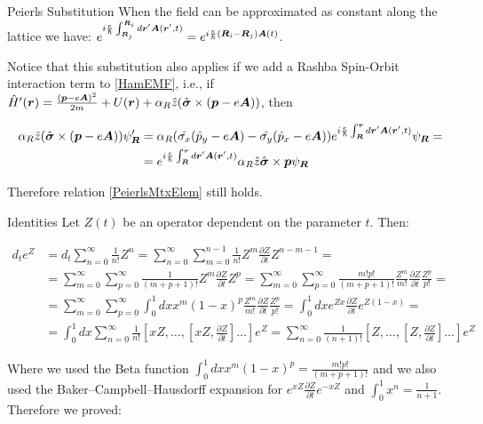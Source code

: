 \begin{subappendices}
\begin{section}{Peierls Substitution}
When the field can be approximated as constant along the lattice we have: $e^{i\frac{e}{\hbar}\int_{\boldsymbol{R}_j}^{\boldsymbol{R}_i} d\boldsymbol{r}'\boldsymbol{A}(\boldsymbol{r}',t)} = e^{i\frac{e}{\hbar} (\boldsymbol{R}_i-\boldsymbol{R}_j) \boldsymbol{A}(t)}$.

Notice that this substitution also applies if we add a Rashba Spin-Orbit interaction term to \ref{HamEMF}, i.e., if $\hat{H}'(\boldsymbol{r}) = \frac{(\boldsymbol{p}-e\boldsymbol{A})^2}{2m} +U(\boldsymbol{r}) + \alpha_R \hat{z}(\hat{\boldsymbol{\sigma}} \times (\boldsymbol{p}-e\boldsymbol{A}))$, then

\begin{align*}
  \alpha_R \hat{z}(\hat{\boldsymbol{\sigma}} \times (\boldsymbol{p}-e\boldsymbol{A})) \psi'_{\boldsymbol{R}} &= \alpha_R(\hat{\sigma_x}(\hat{p}_y-e\boldsymbol{A}) - \hat{\sigma_y}(\hat{p}_x-e\boldsymbol{A})) e^{i\frac{e}{\hbar}\int_{\boldsymbol{R}}^{\boldsymbol{r}}d\boldsymbol{r}'\boldsymbol{A}(\boldsymbol{r}',t)} \psi_{\boldsymbol{R}} = \\
  &= e^{i\frac{e}{\hbar}\int_{\boldsymbol{R}}^{\boldsymbol{r}}d\boldsymbol{r}'\boldsymbol{A}(\boldsymbol{r}',t)} \alpha_R \hat{z}\hat{\boldsymbol{\sigma}} \times \boldsymbol{p} \psi_{\boldsymbol{R}}
\end{align*}

Therefore relation \ref{PeierlsMtxElem} still holds.

\end{section}

\begin{section}{Identities}
\label{AP3B}
Let $Z(t)$ be an operator dependent on the parameter $t$. Then:

\begin{align*}
d_t e^{Z} &= d_t \sum_{n=0}^\infty \frac{1}{n!} Z^n = \sum_{n=0}^\infty \sum_{m=0}^{n-1} \frac{1}{n!} Z^m \frac{\partial Z}{\partial t} Z^{n-m-1} = \\
&= \sum_{m=0}^\infty \sum_{p=0}^\infty \frac{1}{(m+p+1)!}Z^m \frac{\partial Z}{\partial t} Z^p = \sum_{m=0}^\infty \sum_{p=0}^\infty \frac{m!p!}{(m+p+1)!} \frac{Z^m}{m!} \frac{\partial Z}{\partial t} \frac{Z^p}{p!} =\\
&= \sum_{m=0}^\infty \sum_{p=0}^\infty \int_0^1 dx x^m (1-x)^p \frac{Z^m}{m!} \frac{\partial Z}{\partial t} \frac{Z^p}{p!} = \int_0^1 dx e^{Zx} \frac{\partial Z}{\partial t} e^{Z(1-x)} = \\
&= \int_0^1 dx \sum_{n=0}^\infty \frac{1}{n!} \left[xZ, \dots, \left[xZ, \frac{\partial Z}{\partial t}\right] \dots \right] e^Z = \sum_{n=0}^\infty \frac{1}{(n+1)!} \left[Z, \dots, \left[Z, \frac{\partial Z}{\partial t}\right] \dots \right] e^Z
\end{align*}

Where we used the Beta function $\int_0^1 dx x^m (1-x)^p = \frac{m!p!}{(m+p+1)!}$ and we also used the Baker–Campbell–Hausdorff expansion for $e^{xZ}\frac{\partial Z}{\partial t}e^{-xZ}$ and $\int_0^1 x^n = \frac{1}{n+1}$. Therefore we proved:


\end{section}
\end{subappendices}
